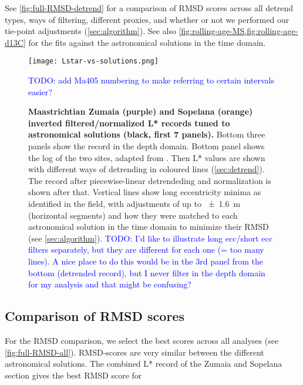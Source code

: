 \documentclass[draft]{agujournal2019}
\newcommand{\ijk}{\textcolor{blue}}
\begin{document}
See \cref{fig:full-RMSD-detrend} for a comparison of \gls{RMSD} scores across all detrend types, ways of filtering, different proxies, and whether or not we performed our tie-point adjustments (\cref{sec:algorithm}).
See also \cref{fig:rolling-age-MS,fig:rolling-age-d13C} for the fits against the astronomical solutions in the time domain.

\begin{figure}[htb]
  \centering
  \texttt{[image: Lstar-vs-solutions.png]}
  \caption{\label{fig:rolling-depth-age}
    \textbf{Maastrichtian Zumaia (purple) and Sopelana (orange) inverted filtered/normalized \gls{L*} records tuned to astronomical solutions (black, first 7 panels).}
    Bottom three panels show the record in the depth domain.
    Bottom panel shows the log of the two sites, adapted from .
    Then \gls{L*} values are shown with different ways of detrending in coloured lines (\cref{sec:detrend}).
    The record after piecewise-linear detrendeding and normalization is shown after that.
    Vertical lines show long eccentricity minima as identified in the field,
    with adjustments of up to \qty{\pm1.6}{\metre} (horizontal segments)
    and how they were matched to each astronomical solution in the time domain to minimize their \gls{RMSD} (see \cref{sec:algorithm}).
    \ijk{TODO: I'd like to illustrate long ecc/short ecc filters separately,
         but they are different for each one (= too many lines).
         A nice place to do this would be in the 3rd panel from the bottom (detrended record),
         but I never filter in the depth domain for my analysis and that might be confusing?}
    }
    \ijk{TODO: add Ma405 numbering to make referring to certain intervals easier?}
\end{figure}

\subsection{Comparison of RMSD scores}


For the RMSD comparison, we select the best scores across all analyses (see \cref{fig:full-RMSD-all}).
\gls{RMSD}-scores are very similar between the different astronomical solutions.
The combined \gls{L*} record of the Zumaia and Sopelana section gives the best \gls{RMSD} score for
\end{document}
